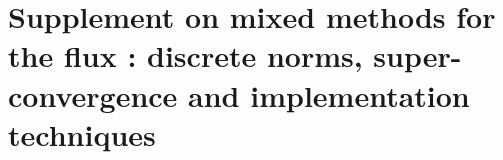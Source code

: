 








% 

\section{Supplement on mixed methods for the flux : discrete norms, super-convergence and implementation techniques}
